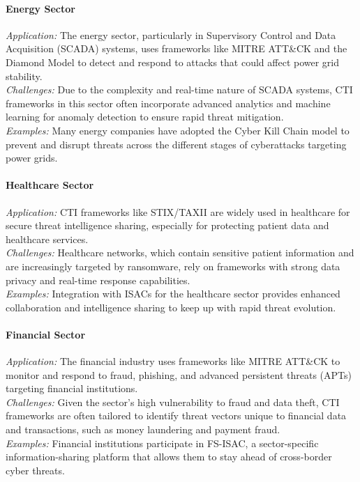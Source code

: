 \documentclass[a4paper,twoside,12pt]{report}
\begin{document}
\paragraph{Energy Sector \citet{gong2021cyber}}
\textit{Application:} The energy sector, particularly in Supervisory Control and Data Acquisition (SCADA) systems, uses frameworks like MITRE ATT\&CK and the Diamond Model to detect and respond to attacks that could affect power grid stability. \\
\textit{Challenges:} Due to the complexity and real-time nature of SCADA systems, CTI frameworks in this sector often incorporate advanced analytics and machine learning for anomaly detection to ensure rapid threat mitigation. \\
\textit{Examples:} Many energy companies have adopted the Cyber Kill Chain model to prevent and disrupt threats across the different stages of cyberattacks targeting power grids.

\paragraph{Healthcare Sector \citet{krauss2022analysis}}
\textit{Application:} CTI frameworks like STIX/TAXII are widely used in healthcare for secure threat intelligence sharing, especially for protecting patient data and healthcare services. \\
\textit{Challenges:} Healthcare networks, which contain sensitive patient information and are increasingly targeted by ransomware, rely on frameworks with strong data privacy and real-time response capabilities. \\
\textit{Examples:} Integration with ISACs \citet{bugiardini2016international} for the healthcare sector provides enhanced collaboration and intelligence sharing to keep up with rapid threat evolution.

\paragraph{Financial Sector \citet{bin2024maximizing}}
\textit{Application:} The financial industry uses frameworks like MITRE ATT\&CK to monitor and respond to fraud, phishing, and advanced persistent threats (APTs) targeting financial institutions. \\
\textit{Challenges:} Given the sector's high vulnerability to fraud and data theft, CTI frameworks are often tailored to identify threat vectors unique to financial data and transactions, such as money laundering and payment fraud. \\
\textit{Examples:} Financial institutions participate in FS-ISAC, a sector-specific information-sharing platform that allows them to stay ahead of cross-border cyber threats.
\end{document}
